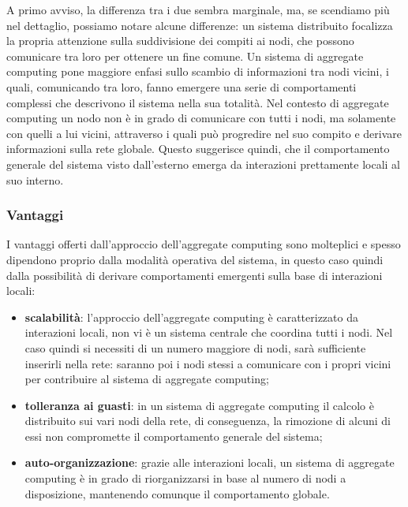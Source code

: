 \documentclass[12pt,a4paper,openright,twoside]{book}
\begin{document}
A primo avviso, la differenza tra i due sembra marginale, ma, se scendiamo più nel dettaglio, possiamo notare alcune differenze:
un sistema distribuito focalizza la propria attenzione sulla suddivisione dei compiti ai nodi, che possono comunicare tra loro per ottenere un fine comune. Un sistema di aggregate computing pone maggiore enfasi sullo scambio di informazioni tra nodi vicini, i quali, comunicando tra loro, fanno emergere una serie di comportamenti complessi che descrivono il sistema nella sua totalità.
Nel contesto di aggregate computing un nodo non è in grado di comunicare con tutti i nodi, ma solamente con quelli a lui vicini, attraverso i quali può progredire nel suo compito e derivare informazioni sulla rete globale. Questo suggerisce quindi, che il comportamento generale del sistema visto dall'esterno emerga da interazioni prettamente locali al suo interno.

\subsubsection{Vantaggi}
I vantaggi offerti dall'approccio dell'aggregate computing sono molteplici e spesso dipendono proprio dalla modalità operativa del sistema, in questo caso quindi dalla possibilità di derivare comportamenti emergenti sulla base di interazioni locali:
\begin{itemize}
	\item \textbf{scalabilità}: l'approccio dell'aggregate computing è caratterizzato da interazioni locali, non vi è un sistema centrale che coordina tutti i nodi. Nel caso quindi si necessiti di un numero maggiore di nodi, sarà sufficiente inserirli nella rete: saranno poi i nodi stessi a comunicare con i propri vicini per contribuire al sistema di aggregate computing;
	\item \textbf{tolleranza ai guasti}: in un sistema di aggregate computing il calcolo è distribuito sui vari nodi della rete, di conseguenza, la rimozione di alcuni di essi non compromette il comportamento generale del sistema;
	\item \textbf{auto-organizzazione}: grazie alle interazioni locali, un sistema di aggregate computing è in grado di riorganizzarsi in base al numero di nodi a disposizione, mantenendo comunque il comportamento globale.
\end{itemize}
\end{document}

